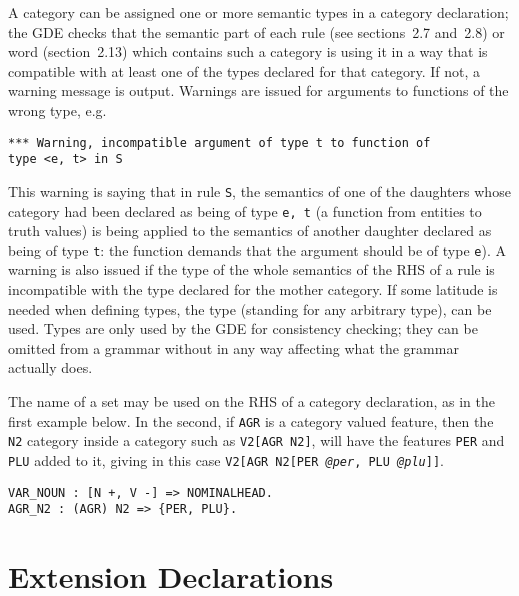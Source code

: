 A category can be assigned one or more semantic types in a category declaration;
the GDE checks that the semantic part of each rule (see sections~2.7 and~2.8) or
word (section~2.13) which contains such a category is using it in a way that is
compatible with at least one of the types declared for that category. If not,
a warning message is output. Warnings are issued for arguments to functions
of the wrong type, e.g.
\begin{ex}
\begin{verbatim}
*** Warning, incompatible argument of type t to function of
type <e, t> in S
\end{verbatim}
\end{ex}
This warning is saying that in rule {\tt S}, the semantics of one of the
daughters whose category had been declared as being of type {\tt \la e, t\ran}
(a function from entities to truth values) is being applied to the
semantics of another daughter declared as being of type {\tt t}: the function
demands that the argument should be of type {\tt e}). A warning is also issued
if the type of the whole semantics of the RHS of a rule is incompatible with the
type declared for the mother category. If some latitude is needed when defining
types, the type {\tt *} (standing for any arbitrary type), can be used. Types
are only used by the GDE for consistency checking; they can be omitted from
a grammar without in any way affecting what the grammar actually does.

The name of a set may be used on the RHS of a category declaration, as in the first
example below. In the second, if {\tt AGR} is a category valued feature,
then the {\tt N2} category inside a category such as {\tt V2[AGR N2]},
will have the features {\tt PER} and {\tt PLU} added to it, giving in this
case {\tt V2[AGR N2[PER {\it @per}, PLU {\it @plu}]]}.
\begin{ex}
\begin{verbatim}
VAR_NOUN : [N +, V -] => NOMINALHEAD.
AGR_N2 : (AGR) N2 => {PER, PLU}.
\end{verbatim}
\end{ex}

\section{Extension Declarations}

